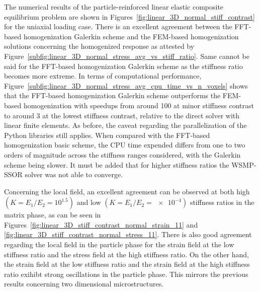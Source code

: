 The numerical results of the particle-reinforced linear elastic composite equilibrium problem are shown in Figures~\ref{fig:linear_3D_normal_stiff_contrast} for the uniaxial loading case.
There is an excellent agreement between the FFT-based homogenization Galerkin scheme and the FEM-based homogenization solutions concerning the homogenized response as attested by Figure~\ref{subfig:linear_3D_normal_stress_avg_vs_stiff_ratio}.
Same cannot be said for the FFT-based homogenization Galerkin scheme as the stiffness ratio becomes more extreme.
In terms of computational performance, Figure~\ref{subfig:linear_3D_normal_stress_avg_cpu_time_vs_n_voxels} shows that the FFT-based homogenization Galerkin scheme outperforms the FEM-based homogenization with speedups from around 100 at minor stiffness contrast to around 3 at the lowest stiffness contrast, relative to the direct solver with linear finite elements.
As before, the caveat regarding the parallelization of the Python libraries still applies.
When compared with the FFT-based homogenization basic scheme, the CPU time expended differs from one to two orders of magnitude across the stiffness ranges considered, with the Galerkin scheme being slower.
It must be added that for higher stiffness ratios the WSMP-SSOR solver was not able to converge.

Concerning the local field, an excellent agreement can be observed at both high \((K=E_1/E_2=10^{1.5})\) and low \((K=E_1/E_2=\num{e-4})\) stiffness ratios in the matrix phase, as can be seen in Figures~\ref{fig:linear_3D_stiff_contrast_normal_strain_11} and \ref{fig:linear_3D_stiff_contrast_normal_stress_11}.
There is also good agreement regarding the local field in the particle phase for the strain field at the low stiffness ratio and the stress field at the high stiffness ratio.
On the other hand, the strain field at the low stiffness ratio and the strain field at the high stiffness ratio exihibt strong oscillations in the particle phase.
This mirrors the previous results concerning two dimensional microstructures.

